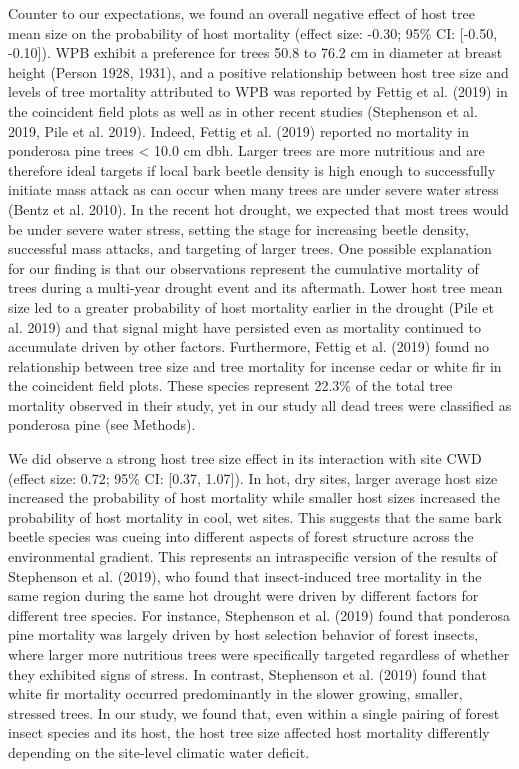 \documentclass[]{article}
\begin{document}
Counter to our expectations, we found an overall negative effect of host
tree mean size on the probability of host mortality (effect size: -0.30;
95\% CI: {[}-0.50, -0.10{]}). WPB exhibit a preference for trees 50.8 to
76.2 cm in diameter at breast height (Person 1928, 1931), and a positive
relationship between host tree size and levels of tree mortality
attributed to WPB was reported by Fettig et al. (2019) in the coincident
field plots as well as in other recent studies (Stephenson et al. 2019,
Pile et al. 2019). Indeed, Fettig et al. (2019) reported no mortality in
ponderosa pine trees \textless{} 10.0 cm dbh. Larger trees are more
nutritious and are therefore ideal targets if local bark beetle density
is high enough to successfully initiate mass attack as can occur when
many trees are under severe water stress (Bentz et al. 2010). In the
recent hot drought, we expected that most trees would be under severe
water stress, setting the stage for increasing beetle density,
successful mass attacks, and targeting of larger trees. One possible
explanation for our finding is that our observations represent the
cumulative mortality of trees during a multi-year drought event and its
aftermath. Lower host tree mean size led to a greater probability of
host mortality earlier in the drought (Pile et al. 2019) and that signal
might have persisted even as mortality continued to accumulate driven by
other factors. Furthermore, Fettig et al. (2019) found no relationship
between tree size and tree mortality for incense cedar or white fir in
the coincident field plots. These species represent 22.3\% of the total
tree mortality observed in their study, yet in our study all dead trees
were classified as ponderosa pine (see Methods).

We did observe a strong host tree size effect in its interaction with
site CWD (effect size: 0.72; 95\% CI: {[}0.37, 1.07{]}). In hot, dry
sites, larger average host size increased the probability of host
mortality while smaller host sizes increased the probability of host
mortality in cool, wet sites. This suggests that the same bark beetle
species was cueing into different aspects of forest structure across the
environmental gradient. This represents an intraspecific version of the
results of Stephenson et al. (2019), who found that insect-induced tree
mortality in the same region during the same hot drought were driven by
different factors for different tree species. For instance, Stephenson
et al. (2019) found that ponderosa pine mortality was largely driven by
host selection behavior of forest insects, where larger more nutritious
trees were specifically targeted regardless of whether they exhibited
signs of stress. In contrast, Stephenson et al. (2019) found that white
fir mortality occurred predominantly in the slower growing, smaller,
stressed trees. In our study, we found that, even within a single
pairing of forest insect species and its host, the host tree size
affected host mortality differently depending on the site-level climatic
water deficit.
\end{document}
